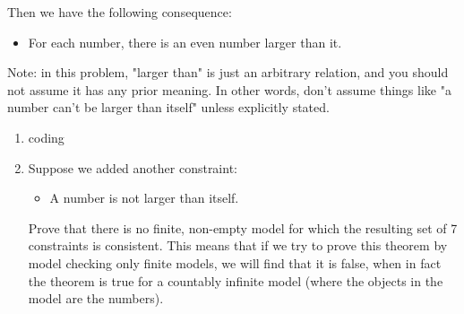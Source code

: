 \documentclass[10pt]{article}
\begin{document}
Then we have the following consequence:

\begin{itemize}
	\item For each number, there is an even number larger than it.
\end{itemize}

Note: in this problem, "larger than" is just an arbitrary relation, and you should not assume it has any prior meaning. In other words, don't assume things like "a number can't be larger than itself" unless explicitly stated.

\begin{enumerate}[label=(\alph*)]

  \item coding
  
  \item Suppose we added another constraint:
  \begin{itemize}
		\item A number is not larger than itself.
	\end{itemize}
	Prove that there is no finite, non-empty model for which the resulting set of 7 constraints is consistent. This means that if we try to prove this theorem by model checking only finite models, we will find that it is false, when in fact the theorem is true for a countably infinite model (where the objects in the model are the numbers).
  
\end{enumerate}
\end{document}
